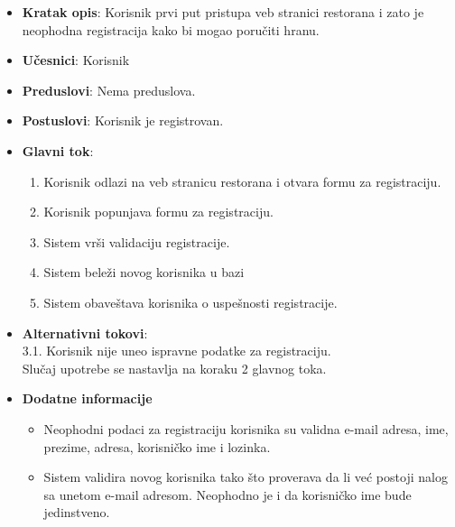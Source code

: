 \begin{itemize}
    \item \textbf{Kratak opis}:
    Korisnik prvi put pristupa veb stranici restorana i zato je neophodna registracija kako bi mogao poručiti hranu.
    \item \textbf{Učesnici}:
    Korisnik
    \item \textbf{Preduslovi}:
    Nema preduslova. 
    \item \textbf{Postuslovi}:
    Korisnik je registrovan. 
    \item \textbf{Glavni tok}:
    \begin{enumerate}
        \item Korisnik odlazi na veb stranicu restorana i otvara formu za registraciju.
        \item Korisnik popunjava formu za registraciju.
        \item Sistem vrši validaciju registracije.
        \item Sistem beleži novog korisnika u bazi
        \item Sistem obaveštava korisnika o uspešnosti registracije.
    \end{enumerate}
\end{itemize}

\begin {itemize}
\item \textbf {Alternativni tokovi}: \\
 3.1. Korisnik nije uneo ispravne podatke za registraciju.\\
 Slučaj upotrebe se nastavlja na koraku 2 glavnog toka.
\end{itemize}
 \begin{itemize} 
    \item \textbf{Dodatne informacije}
    \begin{itemize}
        \item Neophodni podaci za registraciju korisnika su validna e-mail adresa, ime, prezime, adresa, korisničko ime i lozinka.
        \item Sistem validira novog korisnika tako što proverava da li već postoji nalog sa unetom e-mail adresom. Neophodno je i da korisničko ime bude jedinstveno.
    \end{itemize}
\end{itemize}


